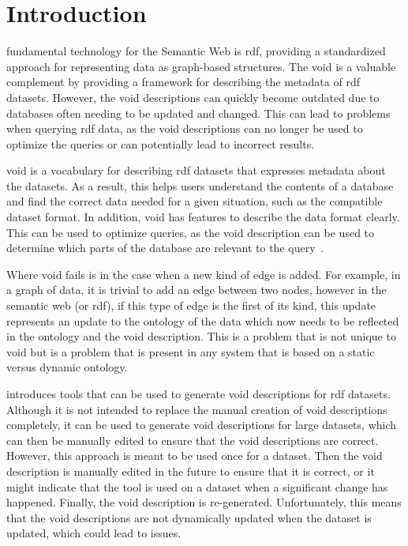 \section{Introduction}\label{sec:introduction2}
 fundamental technology for the Semantic Web is \gls{rdf}, providing a standardized approach for representing data as graph-based structures. The \gls{void} is a valuable complement by providing a framework for describing the metadata of \gls{rdf} datasets. However, the \gls{void} descriptions can quickly become outdated due to databases often needing to be updated and changed. This can lead to problems when querying \gls{rdf} data, as the \gls{void} descriptions can no longer be used to optimize the queries or can potentially lead to incorrect results.

\gls{void} is a vocabulary for describing \gls{rdf} datasets that expresses metadata about the datasets. As a result, this helps users understand the contents of a database and find the correct data needed for a given situation, such as the compatible dataset format. In addition, \gls{void} has features to describe the data format clearly. This can be used to optimize queries, as the \gls{void} description can be used to determine which parts of the database are relevant to the query~\cite{documentation-void}.

Where \gls{void} fails is in the case when a new kind of edge is added. For example, in a graph of data, it is trivial to add an edge between two nodes, however in the semantic web (or \gls{rdf}), if this type of edge is the first of its kind, this update represents an update to the ontology of the data which now needs to be reflected in the ontology and the \gls{void} description. This is a problem that is not unique to \gls{void} but is a problem that is present in any system that is based on a static versus dynamic ontology.

\cite{creating-void-descriptions} introduces tools that can be used to generate \gls{void} descriptions for \gls{rdf} datasets. Although it is not intended to replace the manual creation of \gls{void} descriptions completely, it can be used to generate \gls{void} descriptions for large datasets, which can then be manually edited to ensure that the \gls{void} descriptions are correct. However, this approach is meant to be used once for a dataset. Then the \gls{void} description is manually edited in the future to ensure that it is correct, or it might indicate that the tool is used on a dataset when a significant change has happened. Finally, the \gls{void} description is re-generated. Unfortunately, this means that the \gls{void} descriptions are not dynamically updated when the dataset is updated, which could lead to issues. 

